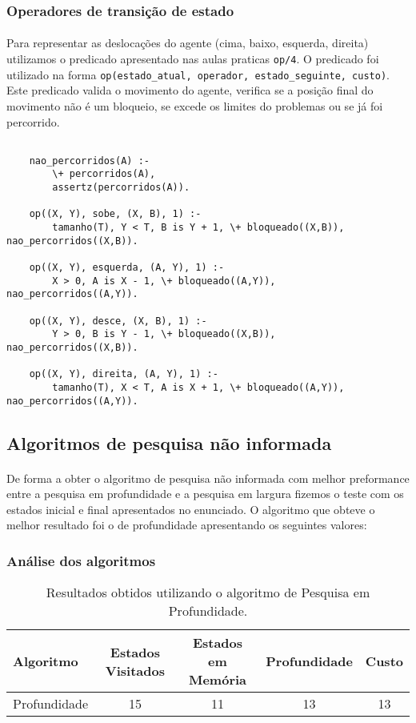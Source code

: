 \documentclass{article}
\begin{document}
\subsubsection{Operadores de transição de estado}

\paragraph{} Para representar as deslocações do agente (cima, baixo, esquerda, direita) utilizamos o predicado apresentado nas aulas praticas \texttt{op/4}. O predicado foi utilizado na forma \texttt{op(estado\_atual, operador, estado\_seguinte, custo)}. Este predicado valida o movimento do agente, verifica se a posição final do movimento não é um bloqueio, se excede os limites do problemas ou se já foi percorrido.
\begin{verbatim}

    nao_percorridos(A) :- 
        \+ percorridos(A),
        assertz(percorridos(A)).
    
    op((X, Y), sobe, (X, B), 1) :-
        tamanho(T), Y < T, B is Y + 1, \+ bloqueado((X,B)), nao_percorridos((X,B)).
    
    op((X, Y), esquerda, (A, Y), 1) :-
        X > 0, A is X - 1, \+ bloqueado((A,Y)), nao_percorridos((A,Y)).
    
    op((X, Y), desce, (X, B), 1) :-
        Y > 0, B is Y - 1, \+ bloqueado((X,B)), nao_percorridos((X,B)).
    
    op((X, Y), direita, (A, Y), 1) :-
        tamanho(T), X < T, A is X + 1, \+ bloqueado((A,Y)), nao_percorridos((A,Y)).
\end{verbatim}

\newpage
\subsection{Algoritmos de pesquisa não informada}
\paragraph{} De forma a obter o algoritmo de pesquisa não informada com melhor preformance entre a pesquisa em profundidade e a pesquisa em largura fizemos o teste com os estados inicial e final apresentados no enunciado. O algoritmo que obteve o melhor resultado foi o de profundidade apresentando os seguintes valores:

\subsubsection{Análise dos algoritmos}
\begin{table}[h]
\centering
\begin{tabular}{l|c|c|c|c}
Algoritmo & Estados Visitados & Estados em Memória & Profundidade & Custo \\\hline
Profundidade & 15 & 11 & 13 & 13 

\end{tabular}
\caption{\label{tab:pni} Resultados obtidos utilizando o algoritmo de Pesquisa em Profundidade.}
\end{table}
\end{document}
